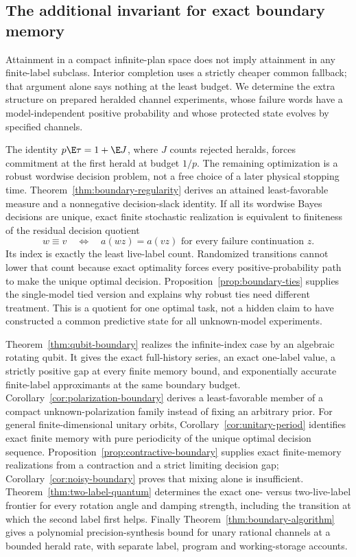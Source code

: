 \subsection{The additional invariant for exact boundary memory}
Attainment in a compact infinite-plan space does not imply attainment in any finite-label subclass. Interior completion uses a strictly cheaper common fallback; that argument alone says nothing at the least budget. We determine the extra structure on prepared heralded channel experiments, whose failure words have a model-independent positive probability and whose protected state evolves by specified channels.

The identity $p\E\tau=1+\E J$, where $J$ counts rejected heralds, forces commitment at the first herald at budget $1/p$. The remaining optimization is a robust wordwise decision problem, not a free choice of a later physical stopping time. Theorem~\ref{thm:boundary-regularity} derives an attained least-favorable measure and a nonnegative decision-slack identity. If all its wordwise Bayes decisions are unique, exact finite stochastic realization is equivalent to finiteness of the residual decision quotient
\[
 w\equiv v\quad\Longleftrightarrow\quad a(wz)=a(vz)
                         \text{ for every failure continuation }z.
\]
Its index is exactly the least live-label count. Randomized transitions cannot lower that count because exact optimality forces every positive-probability path to make the unique optimal decision. Proposition~\ref{prop:boundary-ties} supplies the single-model tied version and explains why robust ties need different treatment. This is a quotient for one optimal task, not a hidden claim to have constructed a common predictive state for all unknown-model experiments.

Theorem~\ref{thm:qubit-boundary} realizes the infinite-index case by an algebraic rotating qubit. It gives the exact full-history series, an exact one-label value, a strictly positive gap at every finite memory bound, and exponentially accurate finite-label approximants at the same boundary budget. Corollary~\ref{cor:polarization-boundary} derives a least-favorable member of a compact unknown-polarization family instead of fixing an arbitrary prior. For general finite-dimensional unitary orbits, Corollary~\ref{cor:unitary-period} identifies exact finite memory with pure periodicity of the unique optimal decision sequence. Proposition~\ref{prop:contractive-boundary} supplies exact finite-memory realizations from a contraction and a strict limiting decision gap; Corollary~\ref{cor:noisy-boundary} proves that mixing alone is insufficient. Theorem~\ref{thm:two-label-quantum} determines the exact one- versus two-live-label frontier for every rotation angle and damping strength, including the transition at which the second label first helps. Finally Theorem~\ref{thm:boundary-algorithm} gives a polynomial precision-synthesis bound for unary rational channels at a bounded herald rate, with separate label, program and working-storage accounts.

